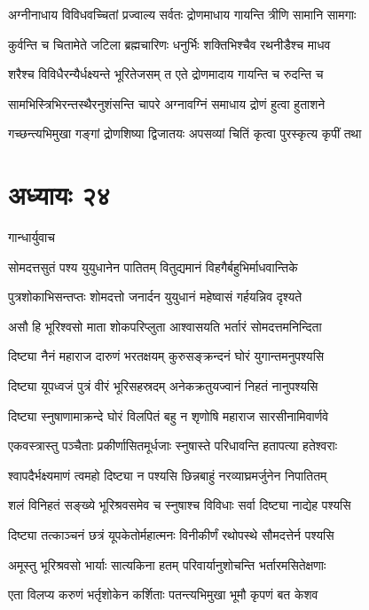 \twolineshloka
{अग्नीनाधाय विविधवच्चितां प्रज्वाल्य सर्वतः}
{द्रोणमाधाय गायन्ति त्रीणि सामानि सामगाः}


\twolineshloka
{कुर्वन्ति च चितामेते जटिला ब्रह्मचारिणः}
{धनुर्भिः शक्तिभिश्चैव रथनीडैश्च माधव}


\twolineshloka
{शरैश्च विविधैरन्यैर्धक्ष्यन्ते भूरितेजसम्}
{त एते द्रोणमादाय गायन्ति च रुदन्ति च}


\twolineshloka
{सामभिस्त्रिभिरन्तस्थैरनुशंसन्ति चापरे}
{अग्नावग्निं समाधाय द्रोणं हुत्वा हुताशने}


\twolineshloka
{गच्छन्त्यभिमुखा गङ्गां द्रोणशिष्या द्विजातयः}
{अपसव्यां चितिं कृत्वा पुरस्कृत्य कृपीं तथा}


\chapter{अध्यायः २४}
\twolineshloka
{गान्धार्युवाच}
{}


\twolineshloka
{सोमदत्तसुतं पश्य युयुधानेन पातितम्}
{वितुद्यमानं विहगैर्बहुभिर्माधवान्तिके}


\twolineshloka
{पुत्रशोकाभिसन्तप्तः शोमदत्तो जनार्दन}
{युयुधानं महेष्वासं गर्हयन्निव दृश्यते}


\twolineshloka
{असौ हि भूरिश्वसो माता शोकपरिप्लुता}
{आश्वासयति भर्तारं सोमदत्तमनिन्दिता}


\twolineshloka
{दिष्ट्या नैनं महाराज दारुणं भरतक्षयम्}
{कुरुसङ्क्रन्दनं घोरं युगान्तमनुपश्यसि}


\twolineshloka
{दिष्ट्या यूपध्वजं पुत्रं वीरं भूरिसहस्रदम्}
{अनेकक्रतुयज्वानं निहतं नानुपश्यसि}


\twolineshloka
{दिष्ट्या स्नुषाणामाक्रन्दे घोरं विलपितं बहु}
{न शृणोषि महाराज सारसीनामिवार्णवे}


\twolineshloka
{एकवस्त्रास्तु पञ्चैताः प्रकीर्णासितमूर्धजाः}
{स्नुषास्ते परिधावन्ति हतापत्या हतेश्वराः}


\twolineshloka
{श्वापदैर्भक्ष्यमाणं त्वमहो दिष्ट्या न पश्यसि}
{छिन्नबाहुं नरव्याघ्रमर्जुनेन निपातितम्}


\twolineshloka
{शलं विनिहतं सङ्ख्ये भूरिश्रवसमेव च}
{स्नुषाश्च विविधाः सर्वा दिष्ट्या नाद्येह पश्यसि}


\twolineshloka
{दिष्ट्या तत्काञ्चनं छत्रं यूपकेतोर्महात्मनः}
{विनीकीर्णं रथोपस्थे सौमदत्तेर्न पश्यसि}


\twolineshloka
{अमूस्तु भूरिश्रवसो भार्याः सात्यकिना हतम्}
{परिवार्यानुशोचन्ति भर्तारमसितेक्षणाः}


\twolineshloka
{एता विलप्य करुणं भर्तृशोकेन कर्शिताः}
{पतन्त्यभिमुखा भूमौ कृपणं बत केशव}


